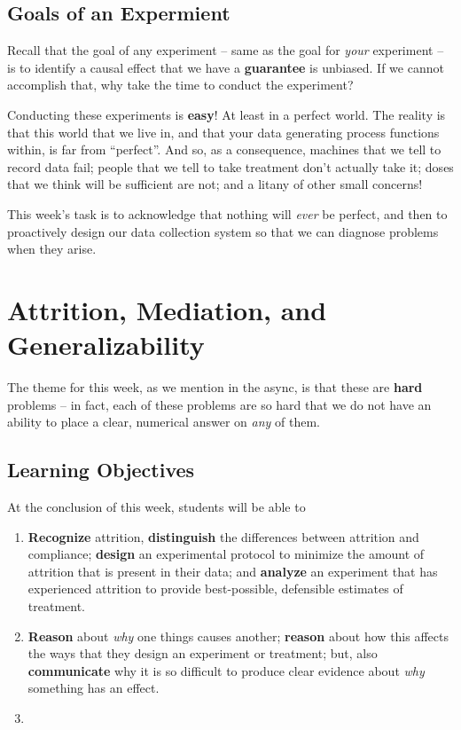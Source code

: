 \documentclass[
]{book}
\providecommand{\tightlist}{%
  \setlength{\itemsep}{0pt}\setlength{\parskip}{0pt}}
\begin{document}
\hypertarget{goals-of-an-expermient}{%
\section{Goals of an Expermient}\label{goals-of-an-expermient}}

Recall that the goal of any experiment -- same as the goal for
\emph{your} experiment -- is to identify a causal effect that we have a
\textbf{guarantee} is unbiased. If we cannot accomplish that, why take
the time to conduct the experiment?

Conducting these experiments is \textbf{easy}! At least in a perfect
world. The reality is that this world that we live in, and that your
data generating process functions within, is far from ``perfect''. And
so, as a consequence, machines that we tell to record data fail; people
that we tell to take treatment don't actually take it; doses that we
think will be sufficient are not; and a litany of other small concerns!

This week's task is to acknowledge that nothing will \emph{ever} be
perfect, and then to proactively design our data collection system so
that we can diagnose problems when they arise.

\hypertarget{attrition-mediation-and-generalizability}{%
\chapter{Attrition, Mediation, and
Generalizability}\label{attrition-mediation-and-generalizability}}

The theme for this week, as we mention in the async, is that these are
\textbf{hard} problems -- in fact, each of these problems are so hard
that we do not have an ability to place a clear, numerical answer on
\emph{any} of them.

\hypertarget{learning-objectives-11}{%
\section{Learning Objectives}\label{learning-objectives-11}}

At the conclusion of this week, students will be able to

\begin{enumerate}
\def\labelenumi{\arabic{enumi}.}
\tightlist
\item
  \textbf{Recognize} attrition, \textbf{distinguish} the differences
  between attrition and compliance; \textbf{design} an experimental
  protocol to minimize the amount of attrition that is present in their
  data; and \textbf{analyze} an experiment that has experienced
  attrition to provide best-possible, defensible estimates of treatment.
\item
  \textbf{Reason} about \emph{why} one things causes another;
  \textbf{reason} about how this affects the ways that they design an
  experiment or treatment; but, also \textbf{communicate} why it is so
  difficult to produce clear evidence about \emph{why} something has an
  effect.
\item
\end{enumerate}
\end{document}
